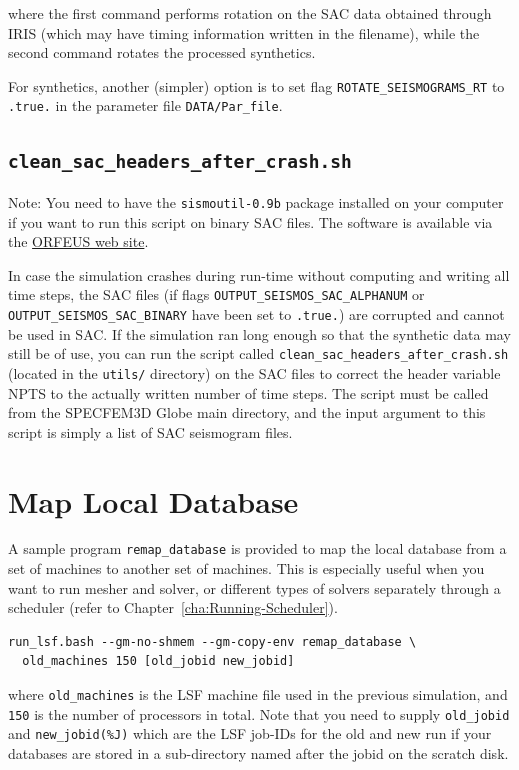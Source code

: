 \noindent
where the first command performs rotation on the SAC data obtained
through IRIS (which may have timing information written in the filename),
while the second command rotates the processed synthetics.\newline


For synthetics, another (simpler) option is to set flag \texttt{ROTATE\_SEISMOGRAMS\_RT}
to \texttt{.true.} in the parameter file \texttt{DATA/Par\_file}.


\subsection{\texttt{clean\_sac\_headers\_after\_crash.sh}}

Note: You need to have the \texttt{sismoutil-0.9b} package installed
on your computer if you want to run this script on binary SAC files.
The software is available via the \href{http://www.orfeus-eu.org}{ORFEUS web site}.\newline


In case the simulation crashes during run-time without computing and
writing all time steps, the SAC files (if flags \texttt{OUTPUT\_SEISMOS\_SAC\_ALPHANUM}
or \texttt{OUTPUT\_SEISMOS\_SAC\_BINARY} have been set to \texttt{.true.})
are corrupted and cannot be used in SAC. If the simulation
ran long enough so that the synthetic data may still be of use, you
can run the script called \texttt{clean\_sac\_headers\_after\_crash.sh}
(located in the \texttt{utils/} directory) on the SAC files to correct
the header variable NPTS to the actually written number of time steps.
The script must be called from the SPECFEM3D Globe main directory,
and the input argument to this script is simply a list of SAC seismogram
files.


\section{Map Local Database}

A sample program \texttt{remap\_database} is provided to map the local
database from a set of machines to another set of machines. This is
especially useful when you want to run mesher and solver, or different
types of solvers separately through a scheduler (refer to Chapter~\ref{cha:Running-Scheduler}).
\begin{verbatim}
run_lsf.bash --gm-no-shmem --gm-copy-env remap_database \
  old_machines 150 [old_jobid new_jobid]
\end{verbatim}
where \texttt{old\_machines} is the LSF machine file used in the previous
simulation, and \texttt{150} is the number of processors in total.
Note that you need to supply \texttt{old\_jobid} and \texttt{new\_jobid(\%J)}
which are the LSF job-IDs for the old and new run if your databases
are stored in a sub-directory named after the jobid on the scratch
disk.




